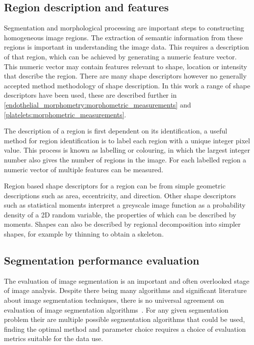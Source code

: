 \subsection{Region description and features}
\label{introduction:image_processing:morphological_processing}
Segmentation and morphological processing are important steps to constructing homogeneous image regions. The extraction of semantic information from these regions is important in understanding the image data. This requires a description of that region, which can be achieved by generating a numeric feature vector. This numeric vector may contain features relevant to shape, location or intensity that describe the region. There are many shape descriptors however no generally accepted method methodology of shape description. In this work a range of shape descriptors have been used, these are described further in \autoref{endothelial_morphometry:morphometric_measurements} and \autoref{platelets:morphometric_measurements}.

The description of a region is first dependent on its identification, a useful method for region identification is to label each region with a unique integer pixel value. This process is known as labelling or colouring, in which the largest integer number also gives the number of regions in the image. For each labelled region a numeric vector of multiple features can be measured.

Region based shape descriptors for a region can be from simple geometric descriptions such as area, eccentricity, and direction. Other shape descriptors such as statistical moments interpret a greyscale image function as a probability density of a 2D random variable, the properties of which can be described by moments. Shapes can also be described by regional decomposition into simpler shapes, for example by thinning to obtain a skeleton.

\subsection{Segmentation performance evaluation}
\label{introduction:image_processing:performance_evaluation}
The evaluation of image segmentation is an important and often overlooked stage of image analysis. Despite there being many algorithms and significant literature about image segmentation techniques, there is no universal agreement on evaluation of image segmentation algorithms~\cite{Benes2015}. For any given segmentation problem their are multiple possible segmentation algorithms that could be used, finding the optimal method and parameter choice requires a choice of evaluation metrics suitable for the data use.

